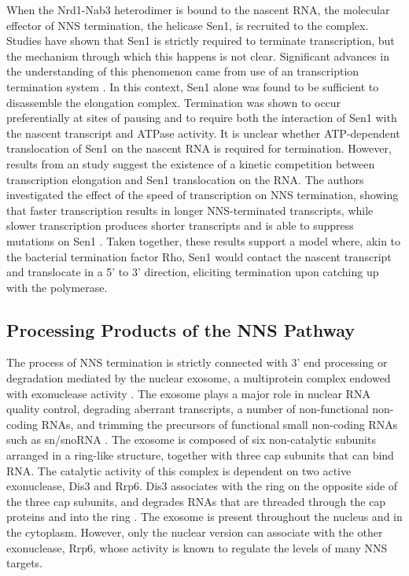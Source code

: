 When the Nrd1-Nab3 heterodimer is bound to the nascent RNA, the molecular effector of NNS termination, the helicase Sen1, is recruited to the complex. 
Studies have shown that Sen1 is strictly required to terminate transcription, but the mechanism through which this happens is not clear. 
Significant advances in the understanding of this phenomenon came from use of an \invitro{} transcription termination system \cite{porrua:2013:bacteriallike}. 
In this context, Sen1 alone was found to be sufficient to disassemble the elongation complex. Termination was shown to occur preferentially at sites of pausing and to require both the interaction of Sen1 with the nascent transcript and ATPase activity. 
It is unclear whether ATP-dependent translocation of Sen1 on the nascent RNA is required for termination. However, results from an \invivo{} study suggest the existence of a kinetic competition between transcription elongation and Sen1 translocation on the RNA. 
The authors investigated the effect of the speed of transcription on NNS termination, showing that faster transcription results in longer NNS-terminated transcripts, while slower transcription produces shorter transcripts and is able to suppress mutations on Sen1 \cite{hazelbaker:2013:kinetic}. 
Taken together, these results support a model where, akin to the bacterial termination factor Rho, Sen1 would contact the nascent transcript and translocate in a 5’ to 3’ direction, eliciting termination upon catching up with the polymerase.

\subsection{Processing Products of the NNS Pathway}

The process of NNS termination is strictly connected with 3' end processing or degradation mediated by the nuclear exosome, a multiprotein complex endowed with exonuclease activity \cite{vasiljeva:2006:nrd1}. 
The exosome plays a major role in nuclear RNA quality control, degrading aberrant transcripts, a number of non-functional non-coding RNAs, and trimming the precursors of functional small non-coding RNAs such as sn/snoRNA \cite[for review see][]{kilchert:2016:regulation}. 
The exosome is composed of six non-catalytic subunits arranged in a ring-like structure, together with three cap subunits that can bind RNA. 
The catalytic activity of this complex is dependent on two active \TtoF{} exonuclease, Dis3 and Rrp6. 
Dis3 associates with the ring on the opposite side of the three cap subunits, and degrades RNAs that are threaded through the cap proteins and into the ring \cite{makino:2015:rna}. 
The exosome is present throughout the nucleus and in the cytoplasm. 
However, only the nuclear version can associate with the other exonuclease, Rrp6, whose activity is known to regulate the levels of many NNS targets.


